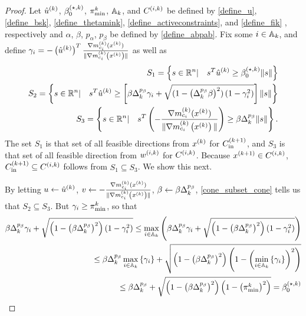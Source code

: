 
\begin{proof}

Let 
${{\hat u}^{(k)}}$, ${\beta_0^{(\star, k)}}$, ${\pi^k_{\textrm{min}}}$, ${\mathbb A_{k}}$, and ${C^{(i, k)}}$
be defined by
\cref{define_u}, \cref{define_bsk}, \cref{define_thetamink}, \cref{define_activeconstraints}, and \cref{define_fik} ,
respectively and $\alpha$, $\beta$, $p_{\alpha}$, $p_{\beta}$ be defined by \cref{define_abpab}.
Fix some $i \in {\mathbb A_{k}}$, and define $\gamma_i = -\left({{\hat u}^{(k)}}\right)^T{\frac{\nabla m^{(k)}_{c_i}(x^{(k)})}{\|\nabla m^{(k)}_{c_i}\left(x^{(k)}\right)\|}}$ as well as
\begin{align*}
S_1 = \left\{s\in\mathbb R^n | \quad s^T{{\hat u}^{(k)}}\ge{\beta_0^{(\star, k)}}\|s\| \right\} \\
S_2 = \left\{s\in\mathbb R^n | \quad s^T{{\hat u}^{(k)}}\ge\left[\beta\Delta_k^{p_{\beta}}\gamma_i + \sqrt{(1 - \left(\Delta_k^{p_{\beta}}\beta\right)^2)\left(1 - \gamma_i^2\right)}\right]\|s\| \right\} \\
S_3 = \left\{s\in\mathbb R^n | \quad s^T\left(-{\frac{\nabla m^{(k)}_{c_i}(x^{(k)})}{\|\nabla m^{(k)}_{c_i}\left(x^{(k)}\right)\|}}\right)\ge\beta\Delta_k^{p_{\beta}}\|s\| \right\}.
\end{align*}
The set $S_1$ is that set of all feasible directions from $x^{(k)}$ for ${C^{(k+1)}_{\textrm{in}}}$, and $S_3$ is that set of all feasible direction from ${w^{(i, k)}}$ for ${C^{(i, k)}}$.
Because ${{x}^{(k+1)}} \in {C^{(i, k)}}$, ${C^{(k+1)}_{\textrm{in}}} \subseteq {C^{(i, k)}}$ follows from $S_1 \subseteq S_3$.
We show this next.


By letting $u \gets {{\hat u}^{(k)}}$, $v \gets -{\frac{\nabla m^{(k)}_{c_i}(x^{(k)})}{\|\nabla m^{(k)}_{c_i}\left(x^{(k)}\right)\|}}$, $\beta \gets \beta \Delta_k^{p_{\beta}}$, \cref{cone_subset_cone} tells us that
$S_2 \subseteq S_3$.
But $\gamma_i \ge {\pi^k_{\textrm{min}}}$, so that
\begin{align*}
\beta\Delta_k^{p_{\beta}}\gamma_i + \sqrt{\left(1 - \left(\beta\Delta_k^{p_{\beta}}\right)^2\right)\left(1 - \gamma_i^2\right)}
\le \max_{i\in{\mathbb A_{k}}} \left(\beta\Delta_k^{p_{\beta}}\gamma_i + \sqrt{\left(1 - \left(\beta\Delta_k^{p_{\beta}}\right)^2\right)\left(1 - \gamma_i^2\right)}\right) \\
\le \beta\Delta_k^{p_{\beta}} \max_{i\in{\mathbb A_{k}}}\left\{\gamma_i\right\} + \sqrt{\left(1 - \left(\beta\Delta_k^{p_{\beta}}\right)^2\right)\left(1 - \left(\min_{i\in{\mathbb A_{k}}}\left\{\gamma_i\right\}\right)^2\right)} \\
\le \beta\Delta_k^{p_{\beta}} + \sqrt{\left(1 - \left(\beta\Delta_k^{p_{\beta}}\right)^2\right)\left(1 - \left({\pi^k_{\textrm{min}}}\right)^2\right)} = {\beta_0^{(\star, k)}}
\end{align*}


\end{proof}
